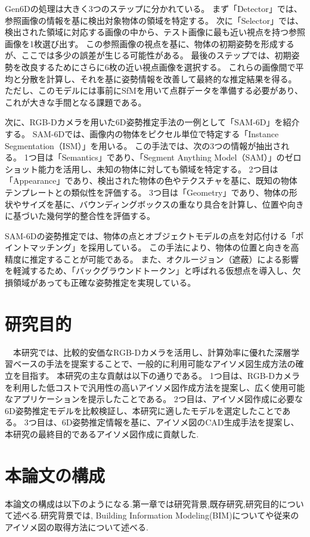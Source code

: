 Gen6Dの処理は大きく3つのステップに分かれている。
まず「Detector」では、参照画像の情報を基に検出対象物体の領域を特定する。
次に「Selector」では、検出された領域に対応する画像の中から、テスト画像に最も近い視点を持つ参照画像を1枚選び出す。
この参照画像の視点を基に、物体の初期姿勢を形成するが、ここでは多少の誤差が生じる可能性がある。
最後のステップでは、初期姿勢を改良するためにさらに6枚の近い視点画像を選択する。
これらの画像間で平均と分散を計算し、それを基に姿勢情報を改善して最終的な推定結果を得る。
ただし、このモデルには事前にSfMを用いて点群データを準備する必要があり、これが大きな手間となる課題である。

次に、RGB-Dカメラを用いた6D姿勢推定手法の一例として「SAM-6D」を紹介する。
SAM-6Dでは、画像内の物体をピクセル単位で特定する「Instance Segmentation（ISM）」を用いる。
この手法では、次の3つの情報が抽出される。
1つ目は「Semantics」であり、「Segment Anything Model（SAM）」のゼロショット能力を活用し、未知の物体に対しても領域を特定する。
2つ目は「Appearance」であり、検出された物体の色やテクスチャを基に、既知の物体テンプレートとの類似性を評価する。
3つ目は「Geometry」であり、物体の形状やサイズを基に、バウンディングボックスの重なり具合を計算し、位置や向きに基づいた幾何学的整合性を評価する。

SAM-6Dの姿勢推定では、物体の点とオブジェクトモデルの点を対応付ける「ポイントマッチング」を採用している。
この手法により、物体の位置と向きを高精度に推定することが可能である。
また、オクルージョン（遮蔽）による影響を軽減するため、「バックグラウンドトークン」と呼ばれる仮想点を導入し、欠損領域があっても正確な姿勢推定を実現している。


\section{研究目的}
　本研究では、比較的安価なRGB-Dカメラを活用し、計算効率に優れた深層学習ベースの手法を提案することで、一般的に利用可能なアイソメ図生成方法の確立を目指す。
本研究の主な貢献は以下の通りである。
1つ目は、RGB-Dカメラを利用した低コストで汎用性の高いアイソメ図作成方法を提案し、広く使用可能なアプリケーションを提示したことである。
2つ目は、アイソメ図作成に必要な6D姿勢推定モデルを比較検証し、本研究に適したモデルを選定したことである。
3つ目は、6D姿勢推定情報を基に、アイソメ図のCAD生成手法を提案し、本研究の最終目的であるアイソメ図作成に貢献した.



\section{本論文の構成}
 本論文の構成は以下のようになる.第一章では研究背景,既存研究,研究目的について述べる.研究背景では,
Building Information Modeling(BIM)についてや従来のアイソメ図の取得方法について述べる.
